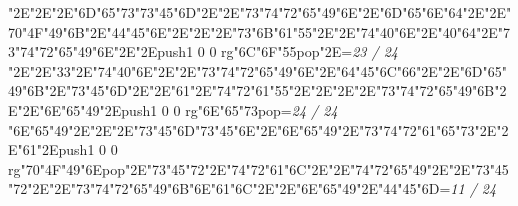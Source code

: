 \null\vfill\quad\quad\quad\ipa\char"2E\quad\quad\quad\quad\ipa\char"2E\quad\ipa\char"2E\ipa\char"6D\ipa\char"65\ipa\char"73\bigskip\ipa\char"73\ipa\char"45\ipa\char"6D\ipa\char"2E\quad\quad\quad\ipa\char"2E\ipa\char"73\ipa\char"74\ipa\char"72\ipa\char"65\ipa\char"49\ipa\char"6E\bigskip\quad\quad\ipa\char"2E\ipa\char"6D\ipa\char"65\ipa\char"6E\ipa\char"64\ipa\char"2E\quad\ipa\char"2E\ipa\char"70\ipa\char"4F\ipa\char"49\ipa\char"6B\ipa\char"2E\ipa\char"44\ipa\char"45\ipa\char"6E\ipa\char"2E\quad\quad\quad\quad\ipa\char"2E\quad\quad\quad\bigskip\quad\ipa\char"2E\ipa\char"73\ipa\char"6B\ipa\char"61\ipa\char"55\ipa\char"2E\quad\quad\ipa\char"2E\ipa\char"74\ipa\char"40\ipa\char"6E\ipa\char"2E\ipa\char"40\ipa\char"64\ipa\char"2E\ipa\char"73\ipa\char"74\ipa\char"72\ipa\char"65\ipa\char"49\ipa\char"6E\bigskip\quad\quad\quad\ipa\char"2E\quad\quad\ipa\char"2E\pdfcolorstack\match push{1 0 0 rg}\ipa\char"6C\ipa\char"6F\ipa\char"55\pdfcolorstack\match pop{}\ipa\char"2E\quad\quad\quad\bigskip\vfill\footline={\hfill\tenrm\it 23 / 24}\eject
\null\vfill\quad\quad\quad\ipa\char"2E\quad\quad\quad\quad\ipa\char"2E\ipa\char"33\ipa\char"2E\quad\quad\quad\bigskip\ipa\char"74\ipa\char"40\ipa\char"6E\ipa\char"2E\quad\quad\quad\ipa\char"2E\ipa\char"73\ipa\char"74\ipa\char"72\ipa\char"65\ipa\char"49\ipa\char"6E\bigskip\quad\quad\ipa\char"2E\ipa\char"64\ipa\char"45\ipa\char"6C\ipa\char"66\ipa\char"2E\quad\ipa\char"2E\ipa\char"6D\ipa\char"65\ipa\char"49\ipa\char"6B\ipa\char"2E\ipa\char"73\ipa\char"45\ipa\char"6D\ipa\char"2E\quad\quad\quad\quad\ipa\char"2E\quad\quad\quad\bigskip\ipa\char"61\ipa\char"2E\ipa\char"74\ipa\char"72\ipa\char"61\ipa\char"55\ipa\char"2E\quad\quad\ipa\char"2E\quad\quad\quad\ipa\char"2E\quad\quad\ipa\char"2E\ipa\char"73\ipa\char"74\ipa\char"72\ipa\char"65\ipa\char"49\ipa\char"6B\bigskip\quad\quad\quad\ipa\char"2E\quad\quad\ipa\char"2E\ipa\char"6E\ipa\char"65\ipa\char"49\ipa\char"2E\pdfcolorstack\match push{1 0 0 rg}\ipa\char"6E\ipa\char"65\ipa\char"73\pdfcolorstack\match pop{}\bigskip\vfill\footline={\hfill\tenrm\it 24 / 24}\eject
\null\vfill\ipa\char"6E\ipa\char"65\ipa\char"49\ipa\char"2E\quad\quad\quad\quad\ipa\char"2E\quad\ipa\char"2E\ipa\char"73\ipa\char"45\ipa\char"6D\bigskip\ipa\char"73\ipa\char"45\ipa\char"6E\ipa\char"2E\ipa\char"6E\ipa\char"65\ipa\char"49\ipa\char"2E\ipa\char"73\ipa\char"74\ipa\char"72\ipa\char"61\ipa\char"65\ipa\char"73\bigskip\quad\quad\ipa\char"2E\quad\quad\quad\quad\ipa\char"2E\ipa\char"61\ipa\char"2E\pdfcolorstack\match push{1 0 0 rg}\ipa\char"70\ipa\char"4F\ipa\char"49\ipa\char"6E\pdfcolorstack\match pop{}\ipa\char"2E\ipa\char"73\ipa\char"45\ipa\char"72\ipa\char"2E\ipa\char"74\ipa\char"72\ipa\char"61\ipa\char"6C\ipa\char"2E\quad\quad\quad\bigskip\quad\ipa\char"2E\ipa\char"74\ipa\char"72\ipa\char"65\ipa\char"49\ipa\char"2E\quad\quad\ipa\char"2E\ipa\char"73\ipa\char"45\ipa\char"72\ipa\char"2E\quad\quad\ipa\char"2E\ipa\char"73\ipa\char"74\ipa\char"72\ipa\char"65\ipa\char"49\ipa\char"6B\bigskip\ipa\char"6E\ipa\char"61\ipa\char"6C\ipa\char"2E\quad\quad\ipa\char"2E\ipa\char"6E\ipa\char"65\ipa\char"49\ipa\char"2E\ipa\char"44\ipa\char"45\ipa\char"6D\bigskip\vfill\footline={\hfill\tenrm\it 11 / 24}\eject
